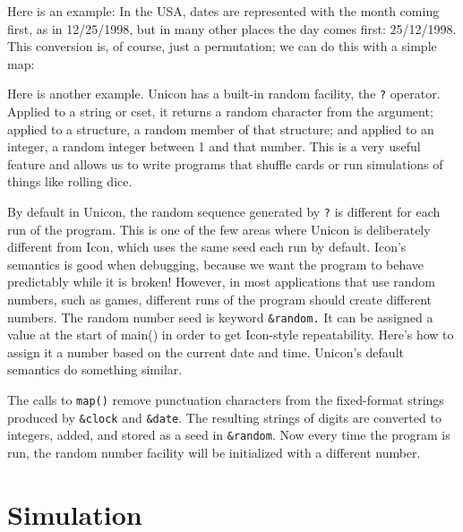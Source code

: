 \bigskip

Here is an example: In the USA, dates are represented with the month
coming first, as in 12/25/1998, but in many other places the day comes
first: 25/12/1998. This conversion is, of course, just a permutation;
we can do this with a simple map:


Here is another example. Unicon has a built-in random facility, the
\texttt{?} operator. Applied to a string or cset, it returns a random
character from the argument; applied to a structure, a random member of
that structure; and applied to an integer, a random integer between 1
and that number. This is a very useful feature and allows us to write
programs that shuffle cards or run simulations of things like rolling
dice.

By default in Unicon, the random sequence generated by \texttt{?} is
different for each run of the program. This is one of the few areas
where Unicon is deliberately different from Icon, which uses the same
seed each run by default. Icon's semantics is good
when debugging, because we want the program to behave predictably while
it is broken! However, in most applications that use random numbers,
such as games, different runs of the program should create different
numbers. The random number seed is keyword
\texttt{\&random.} It can be assigned a value at the start of main() in
order to get Icon-style repeatability. Here's how to
assign it a number based on the current date and time.
Unicon's default semantics do something similar.


\noindent
The calls to \texttt{map()} remove punctuation characters from the
fixed-format strings produced by \texttt{\&clock} and \texttt{\&date}.
The resulting strings of digits are converted to integers, added, and
stored as a seed in \texttt{\&random}. Now every time the program is
run, the random number facility will be initialized with a different
number.

\section{Simulation}

